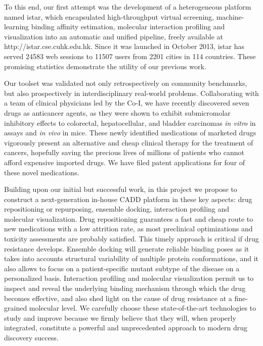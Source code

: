 \documentclass[a4paper,12pt]{article}
\begin{document}
To this end, our first attempt was the development of a heterogeneous platform named istar, which encapsulated high-throughput virtual screening, machine-learning binding affinity estimation, molecular interaction profiling and visualization into an automatic and unified pipeline, freely available at http://istar.cse.cuhk.edu.hk. Since it was launched in October 2013, istar has served 24583 web sessions to 11507 users from 2201 cities in 114 countries. These promising statistics demonstrate the utility of our previous work.

Our toolset was validated not only retrospectively on community benchmarks, but also prospectively in interdisciplinary real-world problems. Collaborating with a team of clinical physicians led by the Co-I, we have recently discovered seven drugs as anticancer agents, as they were shown to exhibit submicromolar inhibitory effects to colorectal, hepatocellular, and bladder carcinomas \textit{in vitro} in assays and \textit{in vivo} in mice. These newly identified medications of marketed drugs vigorously present an alternative and cheap clinical therapy for the treatment of cancers, hopefully saving the precious lives of millions of patients who cannot afford expensive imported drugs. We have filed patent applications for four of these novel medications.

Building upon our initial but successful work, in this project we propose to construct a next-generation in-house CADD platform in these key aspects: drug repositioning or repurposing, ensemble docking, interaction profiling and molecular visualization. Drug repositioning guarantees a fast and cheap route to new medications with a low attrition rate, as most preclinical optimizations and toxicity assessments are probably satisfied. This timely approach is critical if drug resistance develops. Ensemble docking will generate reliable binding poses as it takes into accounts structural variability of multiple protein conformations, and it also allows to focus on a patient-specific mutant subtype of the disease on a personalized basis. Interaction profiling and molecular visualization permit us to inspect and reveal the underlying binding mechanism through which the drug becomes effective, and also shed light on the cause of drug resistance at a fine-grained molecular level. We carefully choose these state-of-the-art technologies to study and improve because we firmly believe that they will, when properly integrated, constitute a powerful and unprecedented approach to modern drug discovery success.
\end{document}
